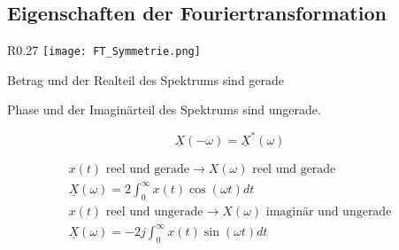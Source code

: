 \subsection{Eigenschaften der Fouriertransformation}
\begin{mdframed}[style=exercise,frametitle=Symmetrie,nobreak=false]
            \begin{wrapfigure}[10]{R}{0.27\textwidth}
                \vspace{-1.4em}
                \texttt{[image: FT\_Symmetrie.png]}
            \end{wrapfigure}

           \begin{minipage}{5cm}
                Betrag und der Realteil des Spektrums sind gerade\\
            \end{minipage}

            \begin{minipage}{5cm}
                Phase und der Imaginärteil des Spektrums sind ungerade.
            \end{minipage}

            \[
                \underline{X}(-\omega) = \underline{X}^*(\omega)
            \]


            \begin{gather*}
                x(t)\text{ reel und gerade}\rightarrow X(\omega)\text{ reel und gerade}\\
                \underline{X}(\omega) = 2\int_0^\infty x(t)\cos(\omega t)dt\\
                x(t)\text{ reel und ungerade}\rightarrow X(\omega)\text{ imaginär und ungerade}\\
                \underline{X}(\omega) = -2j\int_0^\infty x(t)\sin(\omega t)dt
            \end{gather*}
\end{mdframed}
